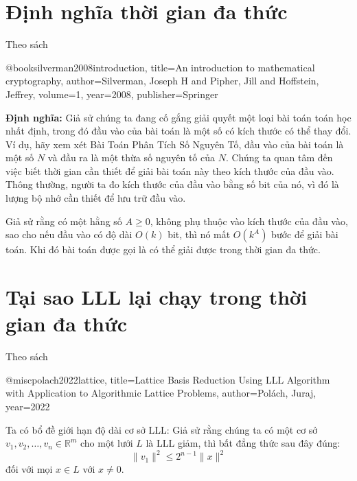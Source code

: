 \documentclass{article}
\begin{document}

\section{Định nghĩa thời gian đa thức}

Theo sách

@book{silverman2008introduction,
title={An introduction to mathematical cryptography},
author={Silverman, Joseph H and Pipher, Jill and Hoffstein, Jeffrey},
volume={1},
year={2008},
publisher={Springer}
}

\textbf{Định nghĩa:} Giả sử chúng ta đang cố gắng giải quyết một loại bài toán toán học nhất định, trong đó đầu vào của bài toán là một số có kích thước có thể thay đổi. Ví dụ, hãy xem xét Bài Toán Phân Tích Số Nguyên Tố, đầu vào của bài toán là một số \(N \) và đầu ra là một thừa số nguyên tố của \(N \). Chúng ta quan tâm đến việc biết thời gian cần thiết để giải bài toán này theo kích thước của đầu vào. Thông thường, người ta đo kích thước của đầu vào bằng số bit của nó, vì đó là lượng bộ nhớ cần thiết để lưu trữ đầu vào.

Giả sử rằng có một hằng số \(A \geq 0 \), không phụ thuộc vào kích thước của đầu vào, sao cho nếu đầu vào có độ dài \(O(k) \) bit, thì nó mất \(O(k^A) \) bước để giải bài toán. Khi đó bài toán được gọi là có thể giải được trong thời gian đa thức.

\section{Tại sao LLL lại chạy trong thời gian đa thức}

Theo sách

@misc{polach2022lattice,
title={Lattice Basis Reduction Using LLL Algorithm with Application to Algorithmic Lattice Problems},
author={Pol{\'a}ch, Juraj},
year={2022}
}

Ta có bổ đề giới hạn độ dài cơ sở LLL:
Giả sử rằng chúng ta có một cơ sở \(v_1, v_2, \ldots, v_n \in \mathbb{R}^m \) cho một lưới \(L \) là LLL giảm, thì bất đẳng thức sau đây đúng:
\[\|v_1\|^2 \leq 2^{n-1} \|x\|^2 \]
đối với mọi \(x \in L \) với \(x \neq 0 \).
\end{document}
